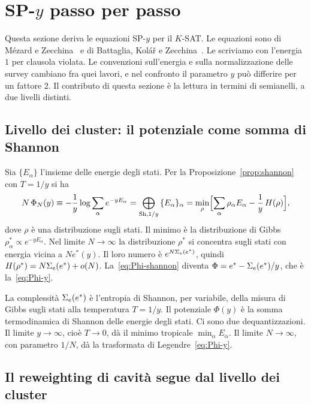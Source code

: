 \section{SP-$y$ passo per passo}
\label{sec:spy}

Questa sezione deriva le equazioni SP-$y$ per il $K$-SAT.
Le equazioni sono di Mézard e Zecchina~\citep{mezard2002random} e di Battaglia, Kolář e Zecchina~\citep{battaglia2004minimizing}.
Le scriviamo con l'energia $1$ per clausola violata.
Le convenzioni sull'energia e sulla normalizzazione delle survey cambiano fra quei lavori, e nel confronto il parametro $y$ può differire per un fattore $2$.
Il contributo di questa sezione è la lettura in termini di semianelli, a due livelli distinti.

\subsection{Livello dei cluster: il potenziale come somma di Shannon}

Sia $\{E_\alpha\}$ l'insieme delle energie degli stati.
Per la Proposizione~\ref{prop:shannon} con $T=1/y$ si ha
\begin{equation}
N\,\Phi_N(y)\equiv-\frac1y\log\sum_\alpha e^{-yE_\alpha}=\bigoplus_{\mathrm{Sh},1/y}\,\{E_\alpha\}_\alpha
=\min_{\rho}\Bigl[\sum_\alpha\rho_\alpha E_\alpha-\frac1y\,H(\rho)\Bigr],
\label{eq:Phi-shannon}
\end{equation}
dove $\rho$ è una distribuzione sugli stati.
Il minimo è la distribuzione di Gibbs $\rho_\alpha^*\propto e^{-yE_\alpha}$.
Nel limite $N\to\infty$ la distribuzione $\rho^*$ si concentra sugli stati con energia vicina a $Ne^*(y)$.
Il loro numero è $e^{N\Sigma_e(e^*)}$, quindi $H(\rho^*)=N\Sigma_e(e^*)+o(N)$.
La~\eqref{eq:Phi-shannon} diventa $\Phi=e^*-\Sigma_e(e^*)/y$, che è la~\eqref{eq:Phi-y}.

\begin{osservazione}
\label{oss:two-levels}
La complessità $\Sigma_e(e^*)$ è l'entropia di Shannon, per variabile, della misura di Gibbs sugli stati alla temperatura $T=1/y$.
Il potenziale $\Phi(y)$ è la somma termodinamica di Shannon delle energie degli stati.
Ci sono due dequantizzazioni.
Il limite $y\to\infty$, cioè $T\to0$, dà il minimo tropicale $\min_\alpha E_\alpha$.
Il limite $N\to\infty$, con parametro $1/N$, dà la trasformata di Legendre~\eqref{eq:Phi-y}.
\end{osservazione}

\subsection{Il reweighting di cavità segue dal livello dei cluster}

